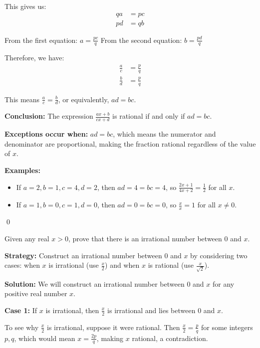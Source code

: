 This gives us:
\begin{align*}
qa &= pc \\
pd &= qb
\end{align*}

From the first equation: $a = \frac{pc}{q}$
From the second equation: $b = \frac{pd}{q}$

Therefore, we have:
\begin{align*}
\frac{a}{c} &= \frac{p}{q} \\
\frac{b}{d} &= \frac{p}{q}
\end{align*}

This means $\frac{a}{c} = \frac{b}{d}$, or equivalently, $ad = bc$.

\textbf{Conclusion:}
The expression $\frac{ax + b}{cx + d}$ is rational if and only if $ad = bc$.

\textbf{Exceptions occur when:}
$ad = bc$, which means the numerator and denominator are proportional, making the fraction rational regardless of the value of $x$.

\textbf{Examples:}
\begin{itemize}
\item If $a = 2, b = 1, c = 4, d = 2$, then $ad = 4 = bc = 4$, so $\frac{2x + 1}{4x + 2} = \frac{1}{2}$ for all $x$.
\item If $a = 1, b = 0, c = 1, d = 0$, then $ad = 0 = bc = 0$, so $\frac{x}{x} = 1$ for all $x \neq 0$.
\end{itemize}\qed


\begin{problembox}
Given any real $x > 0$, prove that there is an irrational number between $0$ and $x$.
\end{problembox}

\noindent\textbf{Strategy:} Construct an irrational number between $0$ and $x$ by considering two cases: when $x$ is irrational (use $\frac{x}{2}$) and when $x$ is rational (use $\frac{x}{\sqrt{2}}$).

\bigskip\noindent\textbf{Solution:}
We will construct an irrational number between $0$ and $x$ for any positive real number $x$.

\textbf{Case 1:} If $x$ is irrational, then $\frac{x}{2}$ is irrational and lies between $0$ and $x$.

To see why $\frac{x}{2}$ is irrational, suppose it were rational. Then $\frac{x}{2} = \frac{p}{q}$ for some integers $p, q$, which would mean $x = \frac{2p}{q}$, making $x$ rational, a contradiction.

